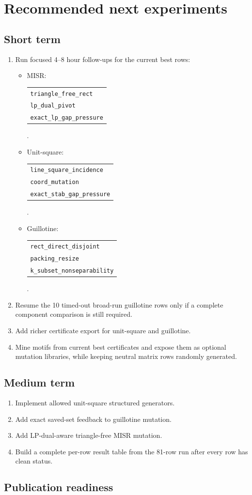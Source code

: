 \documentclass[11pt]{article}
\makeatletter
\newcommand{\code}[1]{\texttt{#1}}
\newcommand{\config}[3]{\begin{tabular}[t]{@{}l@{}}\code{#1}\\\code{#2}\\\code{#3}\end{tabular}}
\makeatother
\begin{document}
\section{Recommended next experiments}

\subsection{Short term}

\begin{enumerate}
\item Run focused 4--8 hour follow-ups for the current best rows:
\begin{itemize}
\item MISR: \config{triangle\_free\_rect}{lp\_dual\_pivot}{exact\_lp\_gap\_pressure}.
\item Unit-square: \config{line\_square\_incidence}{coord\_mutation}{exact\_stab\_gap\_pressure}.
\item Guillotine: \config{rect\_direct\_disjoint}{packing\_resize}{k\_subset\_nonseparability}.
\end{itemize}
\item Resume the 10 timed-out broad-run guillotine rows only if a complete
component comparison is still required.
\item Add richer certificate export for unit-square and guillotine.
\item Mine motifs from current best certificates and expose them as optional
mutation libraries, while keeping neutral matrix rows randomly generated.
\end{enumerate}

\subsection{Medium term}

\begin{enumerate}
\item Implement allowed unit-square structured generators.
\item Add exact saved-set feedback to guillotine mutation.
\item Add LP-dual-aware triangle-free MISR mutation.
\item Build a complete per-row result table from the 81-row run after every
row has clean status.
\end{enumerate}

\subsection{Publication readiness}
\end{document}
